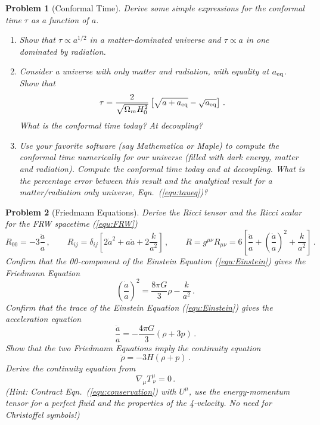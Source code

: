 \documentclass[12pt,letterpaper,rotate]{article}
\def\beq{\begin{equation}}
\def\eeq{\end{equation}}
\newtheorem{thm}{Exercise}
\newtheorem{thmP}{Problem}
\begin{document}
{\begin{thmP}[Conformal Time]
Derive some simple expressions for the conformal time $\tau$ as a function of $a$.

\begin{enumerate}
\item Show that $\tau \propto a^{1/2}$ in a matter-dominated universe and $\tau \propto a$ in one dominated by radiation.
\item Consider a universe with only matter and radiation, with equality at $a_{\rm eq}$. Show that
\beq
\label{equ:taueq}
\tau = \frac{2}{\sqrt{\Omega_m H_0^2}} \left[ \sqrt{a+a_{\rm eq}} - \sqrt{a_{\rm eq}}\right]\, .
\eeq
What is the conformal time today? At decoupling?
\item Use your favorite software (say Mathematica or Maple) to compute the conformal time numerically for our universe (filled with dark energy, matter and radiation). Compute the conformal time today and at decoupling. What is the percentage error between this result and the analytical result for a matter/radiation only universe, Eqn.~(\ref{equ:taueq})?
\end{enumerate}
\end{thmP}

\begin{thmP}[Friedmann Equations]\label{pro:Friedmann}
Derive the Ricci tensor and the Ricci scalar for the FRW spacetime (\ref{equ:FRW})
\beq
R_{00} = -3 \frac{\ddot a}{a}\, , \qquad R_{ij} = \delta_{ij} \left[2 \dot a^2 + a \ddot a + 2\frac{k}{a^2} \right]\, , \qquad R= g^{\mu \nu} R_{\mu \nu} = 6 \left[\frac{\ddot a}{a} + \left(\frac{\dot a}{a}\right)^2 + \frac{k}{a^2}\right]\, .
\eeq
Confirm that the 00-component of the Einstein Equation (\ref{equ:Einstein}) gives the Friedmann Equation
\beq
\left(\frac{\dot a}{a}\right)^2 =  \frac{8\pi G}{3} \rho - \frac{k}{a^2} \, .
\eeq
Confirm that the trace of the Einstein Equation (\ref{equ:Einstein}) 
gives the acceleration equation
\beq
\frac{\ddot a}{a} = - \frac{4\pi G}{3} (\rho + 3 p) \, .
\eeq
Show that the two Friedmann Equations imply the continuity equation
\beq
\dot \rho = - 3H (\rho + p)\, .
\eeq
Derive the continuity equation from 
\beq
\label{equ:conservation}
\nabla_\mu T^\mu_{\ \nu} = 0\, .
\eeq
(Hint: Contract Eqn.~(\ref{equ:conservation}) with $U^\mu$, use the energy-momentum tensor for a perfect fluid and the properties of the 4-velocity. No need for Christoffel symbols!)
\end{thmP}


}
\end{document}
